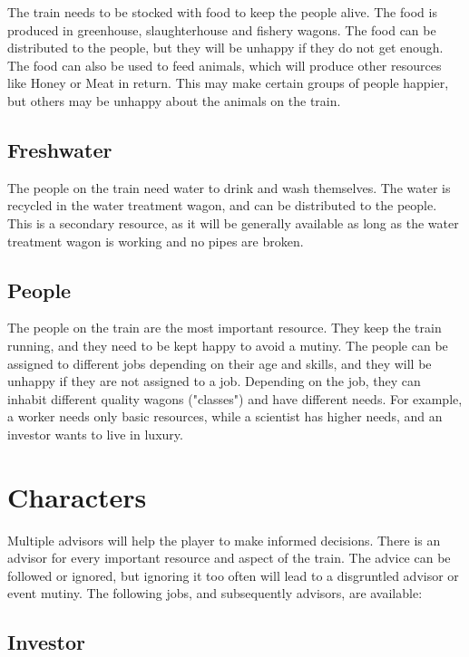 The train needs to be stocked with food to keep the people alive.
The food is produced in greenhouse, slaughterhouse and fishery wagons.
The food can be distributed to the people, but they will be unhappy if they do not get enough.
The food can also be used to feed animals, which will produce other resources like Honey or Meat in return.
This may make certain groups of people happier, but others may be unhappy about the animals on the train.

\subsection{Freshwater}

The people on the train need water to drink and wash themselves.
The water is recycled in the water treatment wagon, and can be distributed to the people.
This is a secondary resource, as it will be generally available as long as the water treatment wagon is working and no pipes are broken.

\subsection{People}

The people on the train are the most important resource.
They keep the train running, and they need to be kept happy to avoid a mutiny.
The people can be assigned to different jobs depending on their age and skills, and they will be unhappy if they are not assigned to a job.
Depending on the job, they can inhabit different quality wagons ("classes") and have different needs.
For example, a worker needs only basic resources, while a scientist has higher needs, and an investor wants to live in luxury.

\section{Characters}

Multiple advisors will help the player to make informed decisions.
There is an advisor for every important resource and aspect of the train.
The advice can be followed or ignored, but ignoring it too often will lead to a disgruntled advisor or event mutiny.
The following jobs, and subsequently advisors, are available:

\subsection{Investor}

